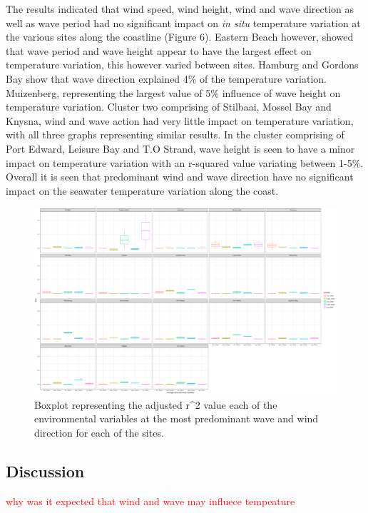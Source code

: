 \documentclass[12pt,a4paper,]{article}
\begin{document}
The results indicated that wind speed, wind height, wind and wave
direction as well as wave period had no significant impact on \emph{in
situ} temperature variation at the various sites along the coastline
(Figure 6). Eastern Beach however, showed that wave period and wave
height appear to have the largest effect on temperature variation, this
however varied between sites. Hamburg and Gordons Bay show that wave
direction explained 4\% of the temperature variation. Muizenberg,
representing the largest value of 5\% influence of wave height on
temperature variation. Cluster two comprising of Stilbaai, Mossel Bay
and Knysna, wind and wave action had very little impact on temperature
variation, with all three graphs representing similar results. In the
cluster comprising of Port Edward, Leisure Bay and T.O Strand, wave
height is seen to have a minor impact on temperature variation with an
r-squared value variating between 1-5\%. Overall it is seen that
predominant wind and wave direction have no significant impact on the
seawater temperature variation along the coast.

\begin{figure}
\centering
\includegraphics{../figures/predominant_ww.pdf}
\caption{Boxplot representing the adjusted r\^{}2 value each of the
environmental variables at the most predominant wave and wind direction
for each of the sites.}
\end{figure}

\hypertarget{discussion}{%
\subsection{Discussion}\label{discussion}}

\textcolor{red}{why was it expected that wind and wave may influece tempeature}
\end{document}
